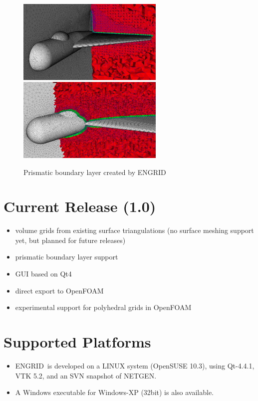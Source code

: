 \documentclass[10pt,a4paper,british]{book}
\newcommand\eg{ENGRID\ }
\newcommand\egv{1.0}
\begin{document}
\begin{figure}
\begin{centering}
\includegraphics[width=7cm]{figures/DeltaWing_02}
\hspace{2mm}
\includegraphics[width=7cm]{figures/DeltaWing_01}\\
\end{centering}
\caption{Prismatic boundary layer created by \eg}
\label{fig:Introduction1}
\end{figure}

\section{Current Release (\egv)}

\begin{itemize}
\item volume grids from existing surface triangulations (no surface meshing
support yet, but planned for future releases)
\item prismatic boundary layer support
\item GUI based on Qt4
\item direct export to OpenFOAM
\item experimental support for polyhedral grids in OpenFOAM
\end{itemize}

\section{Supported Platforms}

\begin{itemize}
\item \eg is developed on a LINUX system (OpenSUSE 10.3), using Qt-4.4.1,
VTK 5.2, and an SVN snapshot of NETGEN.
\item A Windows executable for Windows-XP (32bit) is also available.
\end{itemize}
\end{document}
